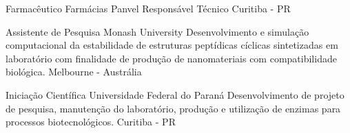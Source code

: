 {Farmacêutico}
{Farmácias Panvel}
{Responsável Técnico}
{Curitiba - PR}

{Assistente de Pesquisa}
{Monash University}
{
Desenvolvimento e simulação computacional da estabilidade 
de estruturas peptídicas cíclicas sintetizadas em laboratório 
com finalidade de produção de nanomateriais com compatibilidade biológica.
}
{Melbourne - Austrália}

{Iniciação Científica}
{Universidade Federal do Paraná}
{
Desenvolvimento de projeto de pesquisa, 
manutenção do laboratório, 
produção e utilização de enzimas para processos biotecnológicos.
}
{Curitiba - PR}